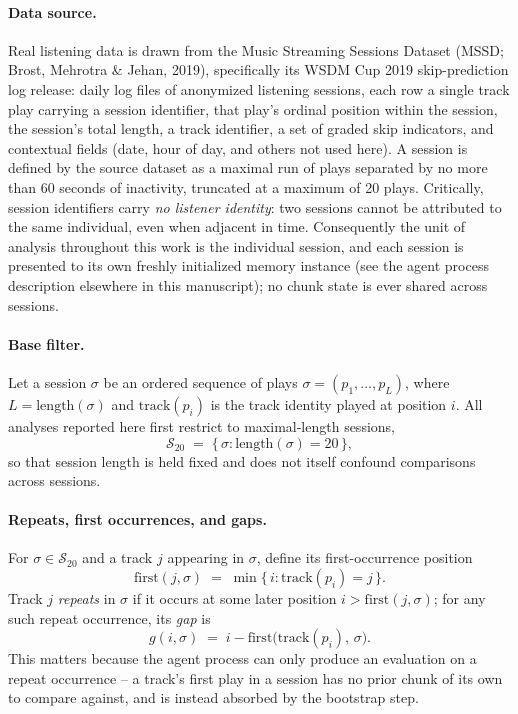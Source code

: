 \documentclass[letterpaper]{article} %
\begin{document}
\paragraph{Data source.}
Real listening data is drawn from the Music Streaming Sessions Dataset (MSSD;
Brost, Mehrotra \& Jehan, 2019), specifically its WSDM Cup 2019 skip-prediction
log release: daily log files of anonymized listening sessions, each row a
single track play carrying a session identifier, that play's ordinal position
within the session, the session's total length, a track identifier, a set of
graded skip indicators, and contextual fields (date, hour of day, and others
not used here). A session is defined by the source dataset as a maximal run of
plays separated by no more than 60 seconds of inactivity, truncated at a
maximum of 20 plays. Critically, session identifiers carry \emph{no listener
identity}: two sessions cannot be attributed to the same individual, even when
adjacent in time. Consequently the unit of analysis throughout this work is
the individual session, and each session is presented to its own freshly
initialized memory instance (see the agent process description elsewhere in
this manuscript); no chunk state is ever shared across sessions.

\paragraph{Base filter.}
Let a session $\sigma$ be an ordered sequence of plays $\sigma = (p_1, \ldots,
p_L)$, where $L = \mathrm{length}(\sigma)$ and $\mathrm{track}(p_i)$ is the
track identity played at position $i$. All analyses reported here first
restrict to maximal-length sessions,
\[
\mathcal S_{20} \;=\; \{\, \sigma : \mathrm{length}(\sigma) = 20 \,\},
\]
so that session length is held fixed and does not itself confound comparisons
across sessions.

\paragraph{Repeats, first occurrences, and gaps.}
For $\sigma \in \mathcal S_{20}$ and a track $j$ appearing in $\sigma$, define
its first-occurrence position
\[
\mathrm{first}(j,\sigma) \;=\; \min\{\, i : \mathrm{track}(p_i) = j \,\}.
\]
Track $j$ \emph{repeats} in $\sigma$ if it occurs at some later position $i >
\mathrm{first}(j,\sigma)$; for any such repeat occurrence, its \emph{gap} is
\[
g(i,\sigma) \;=\; i - \mathrm{first}\bigl(\mathrm{track}(p_i),\, \sigma\bigr).
\]
This matters because the agent process can only produce an
evaluation on a repeat occurrence -- a track's first play in a session has no
prior chunk of its own to compare against, and is instead absorbed by the
bootstrap step.
\end{document}
